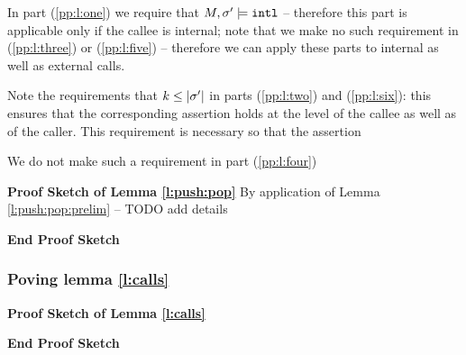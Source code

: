  
 In part  (\ref{pp:l:one}) we require that  $M, \sigma' \models \mbox{\normalfont{\texttt{intl}}}$ -- therefore this part is applicable only if the callee is internal; note that we make no such requirement   in (\ref{pp:l:three}) or (\ref{pp:l:five})  -- therefore we can 
 apply these parts to internal as well as external calls.
 
 Note the requirements that $k \leq |\sigma'|$ in parts (\ref{pp:l:two})  and (\ref{pp:l:six}): this ensures that the corresponding assertion holds at the level of the callee as well as of the caller. 
 This requirement is necessary so  that the assertion 
 
 We do  not make such a requirement in part  (\ref{pp:l:four})  
 
\noindent
\vspace{.1cm}
{\textbf{Proof Sketch  of Lemma \ref{l:push:pop}}}
By application of Lemma  \ref{l:push:pop:prelim} -- TODO add details

{\textbf{End Proof Sketch}} 

\vspace{.2cm}
\subsubsection{Poving  lemma  \ref{l:calls}}

\noindent
\vspace{.1cm}
{\textbf{Proof Sketch  of Lemma \ref{l:calls}}}
 

{\textbf{End Proof Sketch}} 


